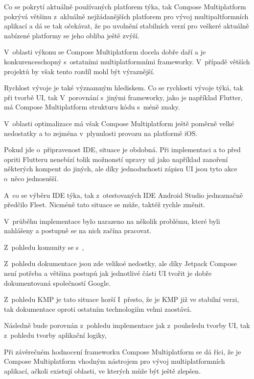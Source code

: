 Co se pokrytí aktuálně používaných platforem týka, tak Compose Multiplatform pokrývá většinu z~akluálně nejžádanějších 
platforem pro vývoj multipaltformních aplikací a dá se tak očekávat, že po uvolnění stabilních verzí pro veškeré 
aktuálně nabízené platformy se jeho obliba ještě zvýší. 

V~oblasti výkonu se Compose Multiplatform docela dobře daří a je konkurenceschopný s~ostatními multiplatformními frameworky.
V~případě větších projektů by však tento rozdíl mohl být výraznější.

Rychlost vývoje je také významným hlediskem. 
Co se rychlosti vývoje týká, tak při tvorbě UI, tak V~porovnání s~jinými frameworky, jako je například Flutter, má Compose Multiplatform strukturu kódu s~méně znaky.


V~oblasti optimalizace má však Compose Multiplatform ještě poměrně velké nedostatky a to zejména v~plynulosti provozu na 
platformě iOS.


Pokud jde o~připravenost IDE, situace je obdobná.  Při implementaci a to před
opriti Flutteru nenebízí tolik možnonstí upravy už jako  například zanoření některých kompent do jiných, ale díky jednoduchosti
zápisu UI jsou tyto akce o~něco jednosušší.

A~co se výběru IDE týka, tak z~otestovaných IDE Android Studio jednoznačně předčilo Fleet. Nicméně tato situace se může, 
taktéž rychle změnit.

V~průběhu implementace bylo narazeno na několik problému, které byli nahlášeny a postupně se na nich začína pracovat.

Z~pohledu komunity se s~,


Z~pohledu dokumentace jsou zde velikoé nedostky, ale díky Jetpack Compose není potřeba a většina postupů jak jednotlivé části 
UI tvořit je dobře dokumentovaná společností Google. 

Z~pohledu KMP je tato situace horší
I~přesto, že je KMP již ve stabilní verzi, tak dokumentace oproti ostatním technologiím velmi zaostává.



Následně bude porovnán z~pohledu implementace  jak z~pouheledu tvorby UI, tak z~pohledu tvorby aplikační logiky,



Při závěrečném hodnocení frameworku Compose Multiplatform se dá říci, že 
je Compose Multiplatform vhodným nástrojem pro vývoj multiplatformních aplikací, ačkoli existují oblasti, 
ve kterých může být ještě zlepšen.


